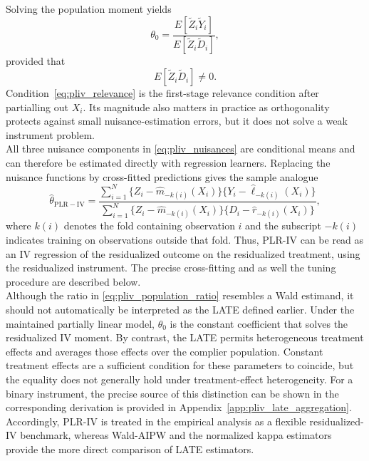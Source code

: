 \documentclass[12pt, a4paper, oneside]{article}
\theoremstyle{plain}
\theoremstyle{definition}
\begin{document}
Solving the population moment yields
\begin{equation}
    \theta_0
    =\frac{E[\widetilde Z_i\widetilde Y_i]}
           {E[\widetilde Z_i\widetilde D_i]},
    \label{eq:pliv_population_ratio}
\end{equation}
provided that
\begin{equation}
    E[\widetilde Z_i\widetilde D_i]\neq0.
    \label{eq:pliv_relevance}
\end{equation}
Condition~\eqref{eq:pliv_relevance} is the first-stage relevance condition after
partialling out $X_i$. 
Its magnitude also matters in practice as orthogonality
protects against small nuisance-estimation errors, but it does not solve a weak
instrument problem.\\
All three nuisance components in \eqref{eq:pliv_nuisances} are conditional
means and can therefore be estimated directly with regression learners.
Replacing the nuisance functions by cross-fitted predictions gives the sample
analogue
\begin{equation}
    \widehat\theta_{\mathrm{PLR-IV}}
    =
    \frac{\sum_{i=1}^N
      \{Z_i-\widehat m_{-k(i)}(X_i)\}
      \{Y_i-\widehat\ell_{-k(i)}(X_i)\}}
    {\sum_{i=1}^N
      \{Z_i-\widehat m_{-k(i)}(X_i)\}
      \{D_i-\widehat r_{-k(i)}(X_i)\}},
    \label{eq:pliv_dml_estimator}
\end{equation}
where $k(i)$ denotes the fold containing observation $i$ and the subscript
$-k(i)$ indicates training on observations outside that fold. Thus, PLR-IV can
be read as an IV regression of the residualized outcome on the residualized
treatment, using the residualized instrument. The precise cross-fitting  and as well the tuning procedure  are described below.\\

Although the ratio in \eqref{eq:pliv_population_ratio} resembles a Wald
estimand, it should not automatically be interpreted as the LATE defined
earlier.
Under the
maintained partially linear model, $\theta_0$ is the constant coefficient that
solves the residualized IV moment. By contrast, the LATE permits heterogeneous
treatment effects and averages those effects over the complier population.
Constant treatment effects are a sufficient condition for these parameters to
coincide, but the equality does not generally hold
under treatment-effect heterogeneity.
For a binary instrument, the precise source of this distinction can be shown
in the
corresponding derivation is provided in Appendix~\ref{app:pliv_late_aggregation}.
Accordingly, PLR-IV is treated in the empirical analysis as a flexible
residualized-IV benchmark, whereas Wald-AIPW and the normalized kappa
estimators provide the more direct comparison of LATE estimators.
\end{document}
